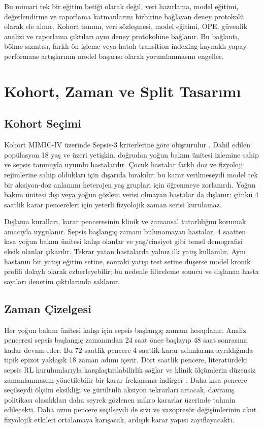 \documentclass[conference]{IEEEtran}
\begin{document}
Bu mimari tek bir eğitim betiği olarak değil, veri hazırlama, model eğitimi, değerlendirme ve raporlama katmanlarını birbirine bağlayan deney protokolü olarak ele alınır. Kohort tanımı, veri sözleşmesi, model eğitimi, OPE, güvenlik analizi ve raporlama çıktıları aynı deney protokolüne bağlanır. Bu bağlantı, bölme sızıntısı, farklı ön işleme veya hatalı transition indexing kaynaklı yapay performans artışlarının model başarısı olarak yorumlanmasını engeller.

\section{Kohort, Zaman ve Split Tasarımı}
\subsection{Kohort Seçimi}
Kohort MIMIC-IV üzerinde Sepsis-3 kriterlerine göre oluşturulur \cite{singer2016sepsis3,mimiciv}. Dahil edilen popülasyon 18 yaş ve üzeri yetişkin, doğrudan yoğun bakım ünitesi izlemine sahip ve sepsis tanımıyla uyumlu hastalardır. Çocuk hastalar farklı doz ve fizyoloji rejimlerine sahip oldukları için dışarıda bırakılır; bu karar verilmeseydi model tek bir aksiyon-doz anlamını heterojen yaş grupları için öğrenmeye zorlanırdı. Yoğun bakım ünitesi dışı veya yoğun gözlem verisi olmayan hastalar da dışlanır; çünkü 4 saatlik karar pencereleri için yeterli fizyolojik zaman serisi kurulamaz.

Dışlama kuralları, karar penceresinin klinik ve zamansal tutarlılığını korumak amacıyla uygulanır. Sepsis başlangıç zamanı bulunamayan hastalar, 4 saatten kısa yoğun bakım ünitesi kalışı olanlar ve yaş/cinsiyet gibi temel demografisi eksik olanlar çıkarılır. Tekrar yatan hastalarda yalnız ilk yatış kullanılır. Aynı hastanın bir yatışı eğitim setine, sonraki yatışı test setine düşerse model kronik profili dolaylı olarak ezberleyebilir; bu nedenle filtreleme sonucu ve dışlanan hasta sayıları denetim çıktılarında saklanır.

\subsection{Zaman Çizelgesi}
Her yoğun bakım ünitesi kalışı için sepsis başlangıç zamanı hesaplanır. Analiz penceresi sepsis başlangıç zamanından 24 saat önce başlayıp 48 saat sonrasına kadar devam eder. Bu 72 saatlik pencere 4 saatlik karar adımlarına ayrıldığında tipik epizot yaklaşık 18 zaman adımı içerir. Dört saatlik pencere, literatürdeki sepsis RL kurulumlarıyla karşılaştırılabilirlik sağlar ve klinik ölçümlerin düzensiz zamanlanmasını yönetilebilir bir karar frekansına indirger \cite{komorowski2018ai,raghu2017sepsis}. Daha kısa pencere seçilseydi ölçüm eksikliği ve gürültülü aksiyon tekrarları artacak, davranış politikası olasılıkları daha seyrek gözlenen mikro kararlar üzerinde tahmin edilecekti. Daha uzun pencere seçilseydi de sıvı ve vazopresör değişimlerinin akut fizyolojik etkileri ortalamaya karışacak, ardışık karar yapısı zayıflayacaktı.
\end{document}
